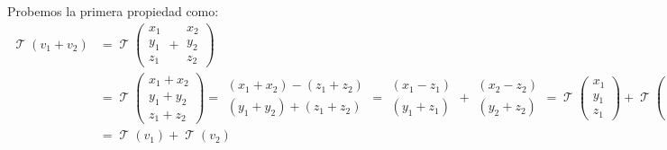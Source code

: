 \documentclass[12pt]{report}                                    %
\DeclareMathOperator \LinealTransformation {\mathcal{T}}
\begin{document}
            Probemos la primera propiedad como:
            \begin{equation*}
            \begin{split}
                \LinealTransformation (v_1 + v_2) & =
                \LinealTransformation \left( \begin{matrix} x_1\\y_1\\z_1 \end{matrix} + \begin{matrix} x_2\\y_2\\z_2 \end{matrix} \right)
                \\
                & = \LinealTransformation \left( \begin{matrix} x_1+x_2\\y_1+y_2\\z_1+z_2 \end{matrix} \right)
                  = \begin{matrix} (x_1+x_2)-(z_1+z_2) \\ (y_1+y_2)+(z_1+z_2) \end{matrix}
                  = \begin{matrix}(x_1-z_1)\\(y_1+z_1)\end{matrix} + \begin{matrix}(x_2-z_2)\\(y_2+z_2)\end{matrix} 
                  = 
                  \LinealTransformation \left(\begin{matrix} x_1\\y_1\\z_1 \end{matrix} \right)
                  +
                  \LinealTransformation \left( \begin{matrix} x_2\\y_2\\z_2 \end{matrix} \right)            
                \\
                & = \LinealTransformation(v_1) + \LinealTransformation(v_2)
            \end{split}
            \end{equation*}
\end{document}
